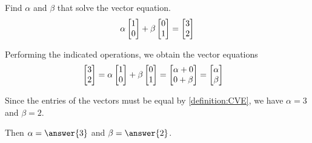 \documentclass{ximera}
\author{Chris Black}
\begin{document}
\begin{exercise}
  Find $\alpha$ and $\beta$ that solve the vector equation.
  \[
    \alpha\begin{bmatrix}1\\0\end{bmatrix}+
    \beta\begin{bmatrix}0\\1\end{bmatrix}
    =
    \begin{bmatrix}3\\2\end{bmatrix}
  \]
  
  \begin{hint}
    Performing the indicated operations, we obtain the vector equations
    \begin{align*}
      \begin{bmatrix}3\\2\end{bmatrix}
   &=\alpha\begin{bmatrix}1\\0\end{bmatrix} + \beta\begin{bmatrix}0\\1\end{bmatrix}
      =\begin{bmatrix}\alpha + 0 \\ 0 + \beta\end{bmatrix}
      =\begin{bmatrix}\alpha\\ \beta\end{bmatrix}
    \end{align*}
  \end{hint}
  
  \begin{hint}
    Since the entries of the vectors must be equal by \ref{definition:CVE}, we have $\alpha = 3$ and $\beta = 2$.
  \end{hint}

  Then $\alpha = \answer{3}$ and $\beta = \answer{2}$.

\end{exercise}
\end{document}
